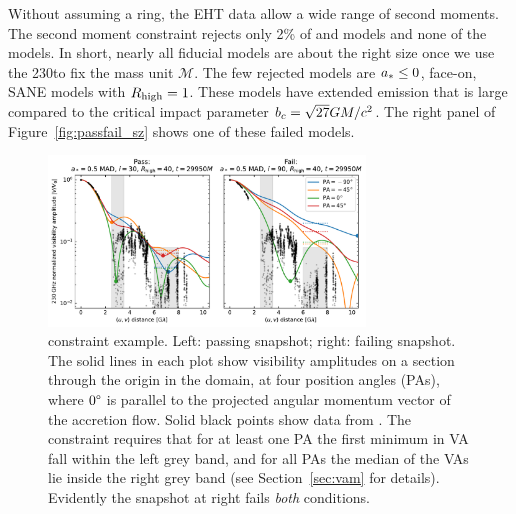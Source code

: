 
Without assuming a ring, the EHT data allow a wide range of second moments.  The second moment constraint rejects only 2\% of \kharma and \bhac models and none of the \hamr models.  In short, nearly all fiducial models are about the right size once we use the 230\GHz to fix the mass unit $\mathcal{M}$.  The few rejected models are $a_* \le 0$, face-on, SANE models with $R_\mathrm{high} = 1$.  These models have extended emission that is large compared to the critical impact parameter $b_c = \sqrt{27} GM/c^2$.  The right panel of Figure~\ref{fig:passfail_sz} shows one of these failed models.

\label{sec:vam}

\begin{figure}
  \centering
  \includegraphics[width=0.75\textwidth]{figures/passfail_va.pdf}
  \caption{\vam constraint example.  Left: passing snapshot; right: failing snapshot.  The solid lines in each plot show visibility amplitudes on a section through the origin in the \uv domain, at four position angles (PAs), where $0\degree$ is parallel to the projected angular momentum vector of the accretion flow.
  Solid black points show data from \aprilvii.  The \vam constraint requires that for at least one PA the first minimum in VA fall within the left grey band, and for all PAs the median of the VAs lie inside the right grey band (see Section~\ref{sec:vam} for details).  Evidently the snapshot at right fails {\em both} conditions.
  }
  \label{fig:passfail_va}
\end{figure}

